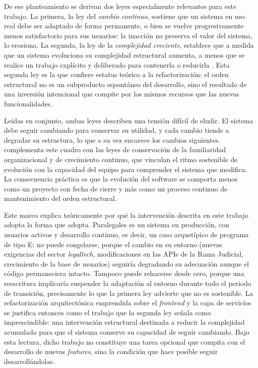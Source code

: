 De ese planteamiento se derivan dos leyes especialmente relevantes para este trabajo. La primera, la ley del \textit{cambio continuo}, sostiene que un sistema en uso real debe ser adaptado de forma permanente, o bien se vuelve progresivamente menos satisfactorio para sus usuarios: la inacción no preserva el valor del sistema, lo erosiona. La segunda, la ley de la \textit{complejidad creciente}, establece que a medida que un sistema evoluciona su complejidad estructural aumenta, a menos que se realice un trabajo explícito y deliberado para contenerla o reducirla \cite{Lehman1980}. Esta segunda ley es la que confiere estatus teórico a la refactorización: el orden estructural no es un subproducto espontáneo del desarrollo, sino el resultado de una inversión intencional que compite por los mismos recursos que las nuevas funcionalidades.

Leídas en conjunto, ambas leyes describen una tensión difícil de eludir. El sistema debe seguir cambiando para conservar su utilidad, y cada cambio tiende a degradar su estructura, lo que a su vez encarece los cambios siguientes. \textcite{Lehman1980} complementa este cuadro con las leyes de conservación de la familiaridad organizacional y de crecimiento continuo, que vinculan el ritmo sostenible de evolución con la capacidad del equipo para comprender el sistema que modifica. La consecuencia práctica es que la evolución del software se comporta menos como un proyecto con fecha de cierre y más como un proceso continuo de mantenimiento del orden estructural.

Este marco explica teóricamente por qué la intervención descrita en este trabajo adopta la forma que adopta. Paralegales es un sistema en producción, con usuarios activos y desarrollo continuo, es decir, un caso arquetípico de programa de tipo E: no puede congelarse, porque el cambio en su entorno (nuevas exigencias del sector \textit{legaltech}, modificaciones en las APIs de la Rama Judicial, crecimiento de la base de usuarios) seguiría degradando su adecuación aunque el código permaneciera intacto. Tampoco puede rehacerse desde cero, porque una reescritura implicaría suspender la adaptación al entorno durante todo el periodo de transición, precisamente lo que la primera ley advierte que no es sostenible. La refactorización arquitectónica emprendida sobre el \textit{frontend} y la capa de servicios se justifica entonces como el trabajo que la segunda ley señala como imprescindible: una intervención estructural destinada a reducir la complejidad acumulada para que el sistema conserve su capacidad de seguir cambiando. Bajo esta lectura, dicho trabajo no constituye una tarea opcional que compita con el desarrollo de nuevas \textit{features}, sino la condición que hace posible seguir desarrollándolas.

